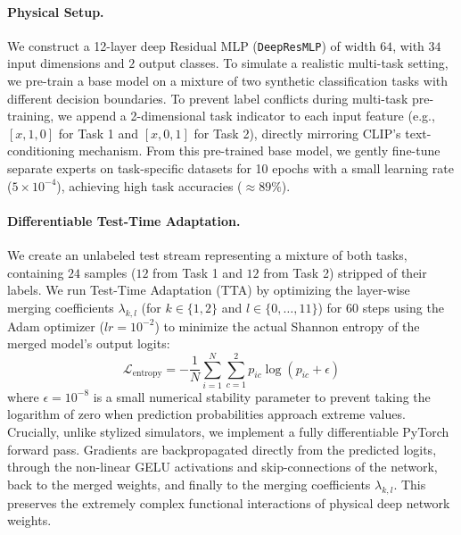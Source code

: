 \paragraph{Physical Setup.} We construct a 12-layer deep Residual MLP (\texttt{DeepResMLP}) of width $64$, with $34$ input dimensions and $2$ output classes. To simulate a realistic multi-task setting, we pre-train a base model on a mixture of two synthetic classification tasks with different decision boundaries. To prevent label conflicts during multi-task pre-training, we append a 2-dimensional task indicator to each input feature (e.g., $[x, 1, 0]$ for Task 1 and $[x, 0, 1]$ for Task 2), directly mirroring CLIP's text-conditioning mechanism. From this pre-trained base model, we gently fine-tune separate experts on task-specific datasets for 10 epochs with a small learning rate ($5 \times 10^{-4}$), achieving high task accuracies ($\approx 89\%$).

\paragraph{Differentiable Test-Time Adaptation.} We create an unlabeled test stream representing a mixture of both tasks, containing $24$ samples ($12$ from Task 1 and $12$ from Task 2) stripped of their labels. We run Test-Time Adaptation (TTA) by optimizing the layer-wise merging coefficients $\lambda_{k, l}$ (for $k \in \{1, 2\}$ and $l \in \{0, \dots, 11\}$) for $60$ steps using the Adam optimizer ($lr = 10^{-2}$) to minimize the actual Shannon entropy of the merged model's output logits:
\begin{equation}
\mathcal{L}_{\text{entropy}} = -\frac{1}{N} \sum_{i=1}^N \sum_{c=1}^2 p_{ic} \log (p_{ic} + \epsilon)
\end{equation}
where $\epsilon = 10^{-8}$ is a small numerical stability parameter to prevent taking the logarithm of zero when prediction probabilities approach extreme values. Crucially, unlike stylized simulators, we implement a fully differentiable PyTorch forward pass. Gradients are backpropagated directly from the predicted logits, through the non-linear GELU activations and skip-connections of the network, back to the merged weights, and finally to the merging coefficients $\lambda_{k, l}$. This preserves the extremely complex functional interactions of physical deep network weights.

